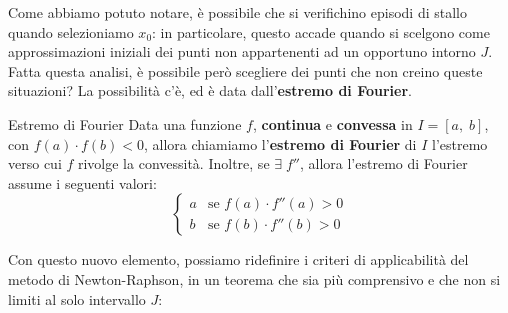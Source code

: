 Come abbiamo potuto notare, è possibile che si verifichino episodi di stallo quando selezioniamo $x_0$: in particolare, questo accade quando si scelgono come approssimazioni iniziali dei punti non appartenenti ad un opportuno intorno $J$. Fatta questa analisi, è possibile però scegliere dei punti che non creino queste situazioni? La possibilità c'è, ed è data dall'\textbf{estremo di Fourier}.

\begin{definition}{Estremo di Fourier}
    Data una funzione $f$, \textbf{continua} e \textbf{convessa} in $I = [a, \; b]$, con $f(a) \cdot f(b) < 0$, allora chiamiamo l'\textbf{estremo di Fourier} di $I$ l'estremo verso cui $f$ rivolge la convessità.
    \nwl
    Inoltre, se $\exists \; f''$, allora l'estremo di Fourier assume i seguenti valori:
    \[ \begin{cases}
        a & \text{se } f(a) \cdot f''(a) > 0 \\
        b & \text{se } f(b) \cdot f''(b) > 0
    \end{cases} \]
\end{definition}

Con questo nuovo elemento, possiamo ridefinire i criteri di applicabilità del metodo di Newton-Raphson, in un teorema che sia più comprensivo e che non si limiti al solo intervallo $J$:

